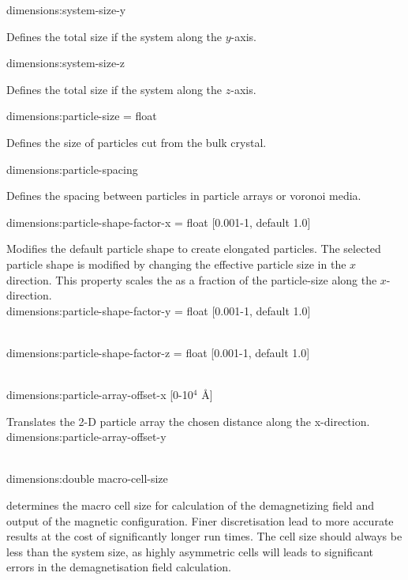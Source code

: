 {\zicf dimensions:system-size-y} Defines the total size if the system along the $y$-axis.\\ \par

{\zicf dimensions:system-size-z} Defines the total size if the system along the $z$-axis.\\ \par

{\zicf dimensions:particle-size = float} Defines the size of particles cut from the bulk crystal.\\ \par

{\zicf dimensions:particle-spacing} Defines the spacing between particles in particle arrays or voronoi media.\\ \par


{\zicf dimensions:particle-shape-factor-x = float [0.001-1, default 1.0]} Modifies the default particle shape to create elongated particles. The selected particle shape is modified by changing the effective particle size in the $x$ direction. This property scales the as a fraction of the particle-size along the $x$-direction.\\

{\zicf dimensions:particle-shape-factor-y = float [0.001-1, default 1.0]}\\

{\zicf dimensions:particle-shape-factor-z = float [0.001-1, default 1.0]}\\

{\zicf dimensions:particle-array-offset-x [0-10$^4$ \AA]} Translates the 2-D particle array the chosen distance along the x-direction.\\

{\zicf dimensions:particle-array-offset-y}\\

{\zicf dimensions:double macro-cell-size} determines the macro cell size for calculation of the demagnetizing field and output of the magnetic configuration. Finer discretisation lead to more accurate results at the cost of significantly longer run times. The cell size should always be less than the system size, as highly asymmetric cells will leads to significant errors in the demagnetisation field calculation.
 

